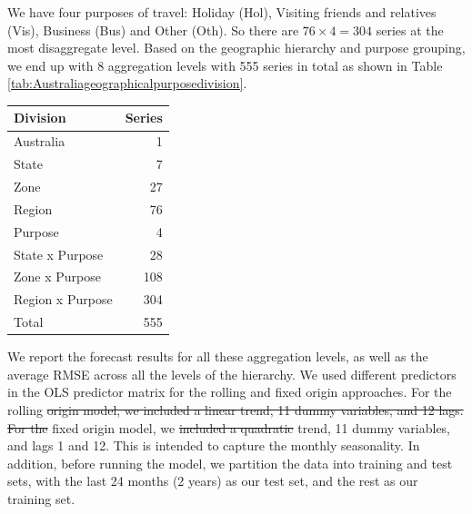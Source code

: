 \documentclass[11pt,a4paper,]{article}
\let\origtable\table
\let\endorigtable\endtable
\renewenvironment{table}[1][2] {
    \expandafter\origtable\expandafter[!htbp]
} {
    \endorigtable
}
\providecommand{\DIFaddtex}[1]{{\protect\color{blue}\uwave{#1}}} %
\providecommand{\DIFdeltex}[1]{{\protect\color{red}\sout{#1}}}                      %
\providecommand{\DIFaddbegin}{} %
\providecommand{\DIFaddend}{} %
\providecommand{\DIFdelbegin}{} %
\providecommand{\DIFdelend}{} %
\providecommand{\DIFadd}[1]{\texorpdfstring{\DIFaddtex{#1}}{#1}} %
\providecommand{\DIFdel}[1]{\texorpdfstring{\DIFdeltex{#1}}{}} %
\newcommand{\DIFscaledelfig}{0.5}
\newlength{\DIFdelgraphicswidth} %
\newlength{\DIFdelgraphicsheight} %
\newcommand{\DIFaddincludegraphics}[2][]{{\color{blue}\fbox{\DIFOincludegraphics[#1]{#2}}}} %
\newcommand{\DIFdelincludegraphics}[2][]{%
\sbox{\DIFdelgraphicsbox}{\DIFOincludegraphics[#1]{#2}}%
\settoboxwidth{\DIFdelgraphicswidth}{\DIFdelgraphicsbox} %
\settoboxtotalheight{\DIFdelgraphicsheight}{\DIFdelgraphicsbox} %
\scalebox{\DIFscaledelfig}{%
\parbox[b]{\DIFdelgraphicswidth}{\usebox{\DIFdelgraphicsbox}\\[-\baselineskip] \rule{\DIFdelgraphicswidth}{0em}}\llap{\resizebox{\DIFdelgraphicswidth}{\DIFdelgraphicsheight}{%
\setlength{\unitlength}{\DIFdelgraphicswidth}%
\begin{picture}(1,1)%
\thicklines\linethickness{2pt} %
{\color[rgb]{1,0,0}\put(0,0){\framebox(1,1){}}}%
{\color[rgb]{1,0,0}\put(0,0){\line( 1,1){1}}}%
{\color[rgb]{1,0,0}\put(0,1){\line(1,-1){1}}}%
\end{picture}%
}\hspace*{3pt}}} %
} %
\DeclareRobustCommand{\DIFaddbegin}{\DIFOaddbegin \let\includegraphics\DIFaddincludegraphics} %
\DeclareRobustCommand{\DIFaddend}{\DIFOaddend \let\includegraphics\DIFOincludegraphics} %
\DeclareRobustCommand{\DIFdelbegin}{\DIFOdelbegin \let\includegraphics\DIFdelincludegraphics} %
\DeclareRobustCommand{\DIFdelend}{\DIFOaddend \let\includegraphics\DIFOincludegraphics} %
\begin{document}
We have four purposes of travel: Holiday (Hol), Visiting friends and relatives (Vis), Business (Bus) and Other (Oth). So there are \(76\times4 = 304\) series at the most disaggregate level. Based on the geographic hierarchy and purpose grouping, we end up with 8 aggregation levels with 555 series in total as shown in Table \ref{tab:Australiageographicalpurposedivision}.

\begin{table}[!h]

\caption{\label{tab:Australiageographicalpurposedivision}Number of Australian domestic tourism series at each aggregation level.}
\centering
\begin{tabular}[t]{lr}
\toprule
Division & Series\\
\midrule
Australia & 1\\
State & 7\\
Zone & 27\\
Region & 76\\
Purpose & 4\\
State x Purpose & 28\\
Zone x Purpose & 108\\
Region x Purpose & 304\\
\hline
Total & 555\\
\bottomrule
\end{tabular}
\end{table}

We report the forecast results for all these aggregation levels, as well as the average RMSE across all the levels of the hierarchy. We used different predictors in the OLS predictor
matrix for the rolling and fixed origin approaches. For the rolling \DIFdelbegin \DIFdel{origin model, we included a linear trend, 11 dummy variables, and 12 lags. For the }\DIFdelend \DIFaddbegin \DIFadd{and }\DIFaddend fixed origin model, we \DIFdelbegin \DIFdel{included a quadratic }\DIFdelend \DIFaddbegin \DIFadd{include a linear }\DIFaddend trend, 11 dummy variables, and lags 1 and 12. This is intended to capture the monthly seasonality. In addition, before running the model, we partition the data into training and test sets, with the last 24 months (2 years) as our test set, and the rest as our training set.
\end{document}
